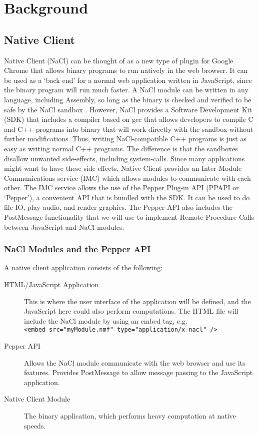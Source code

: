 \chapter{Background}

\label{Chapter2} 


\section{Native Client}
Native Client (NaCl) can be thought of as a new type of plugin for Google Chrome that allows binary programs to run natively in the web browser. It can be used as a `back end' for a normal web application written in JavaScript, since the binary program will run much faster. A NaCl module can be written in any language, including Assembly, so long as the binary is checked and verified to be safe by the NaCl sandbox \cite{nacl}. However, NaCl provides a Software Development Kit (SDK) that includes a compiler based on gcc that allows developers to compile C and C++ programs into binary that will work directly with the sandbox without further modifications. Thus, writing NaCl-compatible C++ programs is just as easy as writing normal C++ programs. The difference is that the sandboxes disallow unwanted side-effects, including system-calls. Since many applications might want to have these side effects, Native Client provides an Inter-Module Communications service (IMC) which allows modules to communicate with each other. The IMC service allows the use of the Pepper Plug-in API (PPAPI or `Pepper'), a convenient API that is bundled with the SDK. It can be used to do file IO, play audio, and render graphics. The Pepper API also includes the PostMessage functionality that we will use to implement Remote Procedure Calls between JavaScript and NaCl modules.

\subsection{NaCl Modules and the Pepper API}
A native client application consists of the following\cite{nacloverview}:
\begin{description}
  \item[HTML/JavaScript Application] 
  This is where the user interface of the application will be defined, and the   JavaScript here could also perform computations. The HTML file will include   the NaCl module by using an embed tag, e.g. \\
   \verb+<embed src="myModule.nmf" type="application/x-nacl" />+
  \item[Pepper API] 
  Allows the NaCl module communicate with the web browser and use its features.   Provides PostMessage to allow message passing to the JavaScript application.
  \item[Native Client Module] 
  The binary application, which performs heavy computation at native speeds.
\end{description}


